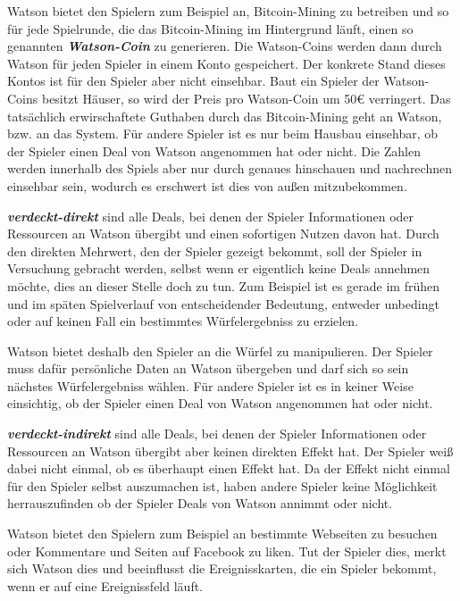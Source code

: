 \documentclass[german]{cgspaper} %
\newcommand{\neuerBegriff}[1]{\textbf{\textit{#1}}}
\begin{document}
Watson bietet den Spielern zum Beispiel an, Bitcoin-Mining zu betreiben und so für jede Spielrunde, die das Bitcoin-Mining im Hintergrund läuft, einen so genannten \neuerBegriff{Watson-Coin} zu generieren.
Die Watson-Coins werden dann durch Watson für jeden Spieler in einem Konto gespeichert.
Der konkrete Stand dieses Kontos ist für den Spieler aber nicht einsehbar.
Baut ein Spieler der Watson-Coins besitzt Häuser, so wird der Preis pro Watson-Coin um 50€ verringert.
Das tatsächlich erwirschaftete Guthaben durch das Bitcoin-Mining geht an Watson, bzw. an das System.
Für andere Spieler ist es nur beim Hausbau einsehbar, ob der Spieler einen Deal von Watson angenommen hat oder nicht.
Die Zahlen werden innerhalb des Spiels aber nur durch genaues hinschauen und nachrechnen einsehbar sein, wodurch es erschwert ist dies von außen mitzubekommen. 

\neuerBegriff{verdeckt-direkt} sind alle Deals, bei denen der Spieler Informationen oder Ressourcen an Watson übergibt und einen sofortigen Nutzen davon hat. 
Durch den direkten Mehrwert, den der Spieler gezeigt bekommt, soll der Spieler in Versuchung gebracht werden, selbst wenn er eigentlich keine Deals annehmen möchte, dies an dieser Stelle doch zu tun.
Zum Beispiel ist es gerade im frühen und im späten Spielverlauf von entscheidender Bedeutung, entweder unbedingt oder auf keinen Fall ein bestimmtes Würfelergebniss zu erzielen.

Watson bietet deshalb den Spieler an die Würfel zu manipulieren.
Der Spieler muss dafür persönliche Daten an Watson übergeben und darf sich so sein nächstes Würfelergebniss wählen.
Für andere Spieler ist es in keiner Weise einsichtig, ob der Spieler einen Deal von Watson angenommen hat oder nicht.

\neuerBegriff{verdeckt-indirekt} sind alle Deals, bei denen der Spieler Informationen oder Ressourcen an Watson übergibt aber keinen direkten Effekt hat.
Der Spieler weiß dabei nicht einmal, ob es überhaupt einen Effekt hat.
Da der Effekt nicht einmal für den Spieler selbst auszumachen ist, haben andere Spieler keine Möglichkeit herrauszufinden ob der Spieler Deals von Watson annimmt oder nicht.

Watson bietet den Spielern zum Beispiel an bestimmte Webseiten zu besuchen oder Kommentare und Seiten auf Facebook zu liken.
Tut der Spieler dies, merkt sich Watson dies und beeinflusst die Ereignisskarten, die ein Spieler bekommt, wenn er auf eine Ereignissfeld läuft.


\end{document}
